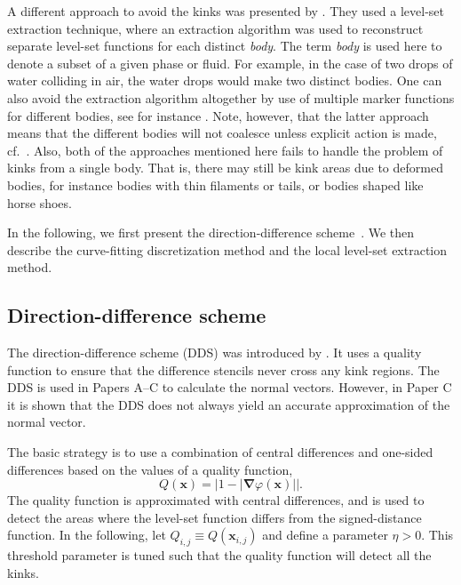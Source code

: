 \documentclass[11pt,b5paper,DIV=calc,BCOR1.3cm,headings=small,%
               footinclude=false,headsepline]{scrbook}
\newcommand*{\vct}[1]{\ensuremath{\boldsymbol{#1}}}
\newcommand*{\del}{\boldsymbol\nabla}
\newcommand*{\grad}{\del}
\begin{document}
A different approach to avoid the kinks was presented by \citet{Salac08}.  They
used a level-set extraction technique, where an extraction algorithm was used
to reconstruct separate level-set functions for each distinct \emph{body}.  The
term \emph{body} is used here to denote a subset of a given phase or fluid.
For example, in the case of two drops of water colliding in air, the water
drops would make two distinct bodies.  One can also avoid the extraction
algorithm altogether by use of multiple marker functions for different bodies,
see for instance \cite{Coyajee09,Kwakkel12}.  Note, however, that the latter
approach means that the different bodies will not coalesce unless explicit
action is made, cf.~\cite{Kwakkel13}.  Also, both of the approaches mentioned
here fails to handle the problem of kinks from a single body.  That is, there
may still be kink areas due to deformed bodies, for instance bodies with thin
filaments or tails, or bodies shaped like horse shoes.

In the following, we first present the direction-difference
scheme~\cite{Macklin05}.  We then describe the curve-fitting discretization
method and the local level-set extraction method.

\subsection{Direction-difference scheme}
\label{sec:dds}
The direction-difference scheme (DDS) was introduced by \citet{Macklin05}.  It
uses a quality function to ensure that the difference stencils never cross any
kink regions.  The DDS is used in Papers A--C to calculate the normal vectors.
However, in Paper C it is shown that the DDS does not always yield an accurate
approximation of the normal vector.

The basic strategy is to use a combination of central differences and one-sided
differences based on the values of a quality function,
\begin{equation}
  Q(\vct x) = \left| 1 - |\grad\varphi(\vct x)|\right|.
  \label{eq:quality}
\end{equation}
The quality function is approximated with central differences, and is used to
detect the areas where the level-set function differs from the signed-distance
function.  In the following, let $Q_{i,j} \equiv Q(\vct x_{i,j})$ and define
a parameter $\eta>0$.  This threshold parameter is tuned such that the quality
function will detect all the kinks.
\end{document}
